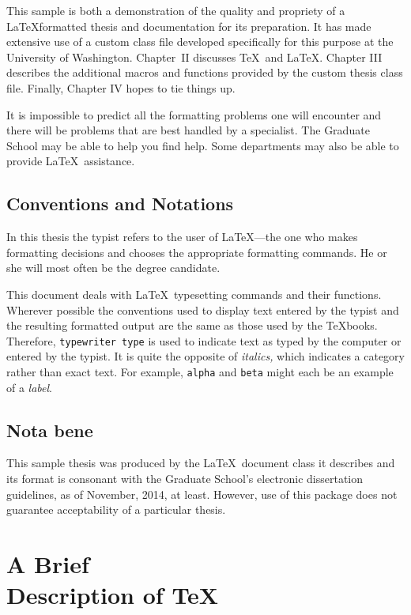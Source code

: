 \documentclass [11pt, proquest] {uwthesis}[2020/02/24]
\begin{document}
This sample is both a demonstration of the quality and
propriety of a \LaTeX formatted thesis and
documentation for its preparation.
It has made extensive use of a custom class file
developed specifically for this purpose
at the University of Washington.  Chapter~II discusses
\TeX\ and \LaTeX.
Chapter III describes the additional macros and functions
provided by the custom thesis class file.  Finally, Chapter IV hopes to tie things up.

It is
impossible to predict all the formatting problems one will encounter
and there will be problems that are best handled
by a specialist.
The Graduate School may be able to help you find help.
Some departments may also be able to provide \LaTeX\ assistance.


\section{Conventions and Notations}

In this thesis the typist
refers to the user of \LaTeX---the one who
makes formatting decisions and chooses the appropriate
formatting commands.
He or she will most often be the degree candidate.

This document deals with \LaTeX\ typesetting commands and their
functions.  Wherever possible the conventions used to display
text entered by the typist and the resulting formatted output
are the same as those used by the \TeX books.
Therefore, {\tt typewriter type} is used to indicate text
as typed by the computer
or entered by the typist.
It is quite the opposite of {\it italics,} which indicates
a category rather than exact text.  For example,
{\tt alpha} and {\tt beta} might each be an example of a {\it label}.


\section{Nota bene}

This sample thesis was produced by the \LaTeX\ document class it describes
and its format is consonant with the Graduate School's electronic dissertation guidelines,
as of November, 2014, at least.
However, use of this package does not guarantee acceptability
of a particular thesis.



\chapter{A Brief \\ Description of \protect\TeX}
\end{document}

